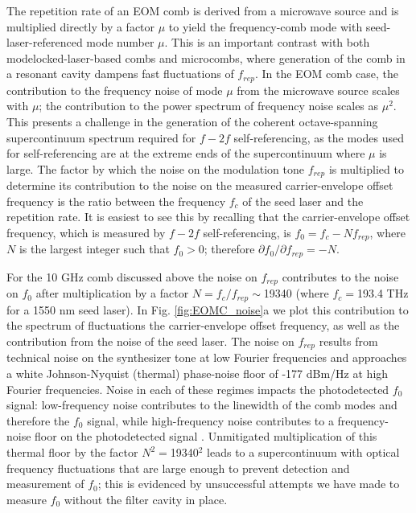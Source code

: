 The repetition rate of an EOM comb is derived from a microwave source and is multiplied directly by a factor $\mu$ to yield the frequency-comb mode with seed-laser-referenced mode number $\mu$. This is an important contrast with both modelocked-laser-based combs and microcombs, where generation of the comb in a resonant cavity dampens fast fluctuations of $f_{rep}$. In the EOM comb case, the contribution to the frequency noise of mode $\mu$ from the microwave source scales with $\mu$; the contribution to the power spectrum of frequency noise scales as $\mu^2$. This presents a challenge in the generation of the coherent octave-spanning supercontinuum spectrum required for $f-2f$ self-referencing, as the modes used for self-referencing are at the extreme ends of the supercontinuum where $\mu$ is large. The factor by which the noise on the modulation tone $f_{rep}$ is multiplied to determine its contribution to the noise on the measured carrier-envelope offset frequency is the ratio between the frequency $f_c$ of the seed laser and the repetition rate. It is easiest to see this by recalling that the carrier-envelope offset frequency, which is measured by $f-2f$ self-referencing, is $f_0=f_c-Nf_{rep}$, where $N$ is the largest integer such that $f_0>0$; therefore $\partial f_0/\partial f_{rep}=-N$. 

For the 10 GHz comb discussed above the noise on $f_{rep}$ contributes to the noise on $f_0$ after multiplication by a factor $N=f_c/f_{rep}\sim$19340 (where $f_c=$193.4 THz for a 1550 nm seed laser). In Fig. \ref{fig:EOMC_noise}a we plot this contribution to the spectrum of fluctuations the carrier-envelope offset frequency, as well as the contribution from the noise of the seed laser. The noise on $f_{rep}$ results from technical noise on the synthesizer tone at low Fourier frequencies and approaches a white Johnson-Nyquist (thermal) phase-noise floor of -177 dBm/Hz at high Fourier frequencies. Noise in each of these regimes impacts the photodetected $f_0$ signal: low-frequency noise contributes to the linewidth of the comb modes and therefore the $f_0$ signal, while high-frequency noise contributes to a frequency-noise floor on the photodetected signal \cite{DiDomenico2010}. Unmitigated multiplication of this thermal floor by the factor $N^2=$19340$^2$ leads to a supercontinuum with optical frequency fluctuations that are large enough to prevent detection and measurement of $f_0$; this is evidenced by unsuccessful attempts we have made to measure $f_0$ without the filter cavity in place.

